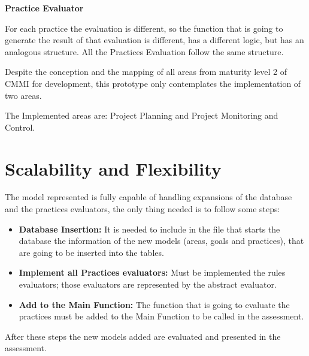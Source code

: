 \vspace{1cm}

\textbf{Practice Evaluator}

For each practice the evaluation is different, so the function that is going to generate the result of that evaluation is different, has a different logic, but has an analogous structure. All the Practices Evaluation follow the same structure.

\vspace{1cm}

Despite the conception and the mapping of all areas from maturity level 2 of CMMI for development, this prototype only contemplates the implementation of two areas.

The Implemented areas are: Project Planning and Project Monitoring and Control.

\section{Scalability and Flexibility}

The model represented is fully capable of handling expansions of the database and the practices evaluators, the only thing needed is to follow some steps:
\begin{itemize}
	\item \textbf{Database Insertion: } It is needed to include in the file that starts the database the information of the new models (areas, goals and practices), that are going to be inserted into the tables.
	\item \textbf{Implement all Practices evaluators: } Must be implemented the rules evaluators; those evaluators are represented by the abstract evaluator.
	\item \textbf{Add to the Main Function: } The function that is going to evaluate the practices must be added to the Main Function to be called in the assessment.
\end{itemize}

After these steps the new models added are evaluated and presented in the assessment.
